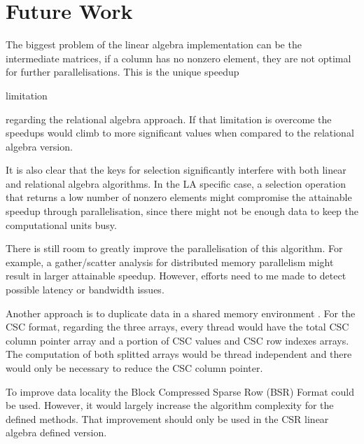 \section{Future Work}
\label{future_work}
\indent


The biggest problem of the linear algebra implementation can be the intermediate matrices, if a column has no nonzero element, they are not optimal for further parallelisations. This is the unique speedup 

limitation

regarding the relational algebra approach. If that limitation is overcome the speedups would climb to more significant values when compared to the relational algebra version. \par 
It is also clear that the keys for selection significantly interfere with both linear and relational algebra algorithms. In the LA specific case, a selection operation that returns a low number of nonzero elements might compromise the attainable speedup through parallelisation, since there might not be enough data to keep the computational units busy. \par 

There is still room to greatly improve the parallelisation of this algorithm. For example,  a gather/scatter analysis for distributed memory parallelism might result in larger attainable speedup. However, efforts need to me made to detect possible latency or bandwidth issues. \par 
Another approach is to duplicate data in a shared memory environment . For the CSC format, regarding the three arrays, every thread would have the total CSC column pointer array and a portion of CSC values and CSC row indexes arrays. The computation of both splitted arrays would be thread independent and there would only be necessary to reduce the CSC column pointer. \par 

To improve data locality the Block Compressed Sparse Row (BSR) Format could be used. However, it would largely increase the algorithm complexity for the defined methods. That improvement should only be used in the CSR linear algebra defined version.\par 

